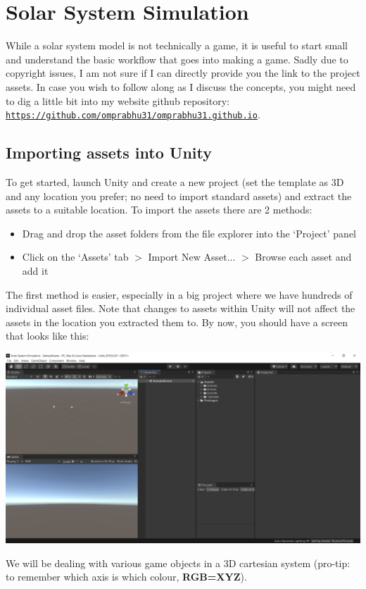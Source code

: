 \documentclass{article}[a4paper,12pt]
\theoremstyle{definition}
\begin{document}
\hrulefill
\pagebreak
\section{Solar System Simulation}
While a solar system model is not technically a game, it is useful to start small and understand the basic workflow that goes into making a game. Sadly due to copyright issues, I am not sure if I can directly provide you the link to the project assets. In case you wish to follow along as I discuss the concepts, you might need to dig a little bit into my website github repository: \texttt{\href{https://github.com/omprabhu31/omprabhu31.github.io}{https://github.com/omprabhu31/omprabhu31.github.io}}.
\subsection{Importing assets into Unity}
To get started, launch Unity and create a new project (set the template as 3D and any location you prefer; no need to import standard assets) and extract the assets to a suitable location. To import the assets there are 2 methods:
\begin{itemize}
	\item Drag and drop the asset folders from the file explorer into the `Project' panel
	\item Click on the `Assets' tab $>$ Import New Asset... $>$ Browse each asset and add it
\end{itemize}
The first method is easier, especially in a big project where we have hundreds of individual asset files. Note that changes to assets within Unity will not affect the assets in the location you extracted them to. By now, you should have a screen that looks like this: 
\begin{center}\includegraphics[width=\textwidth]{solarsystem_startscreen.png}\end{center}
We will be dealing with various game objects in a 3D cartesian system (pro-tip: to remember which axis is which colour, \textbf{RGB=XYZ}).
\end{document}
